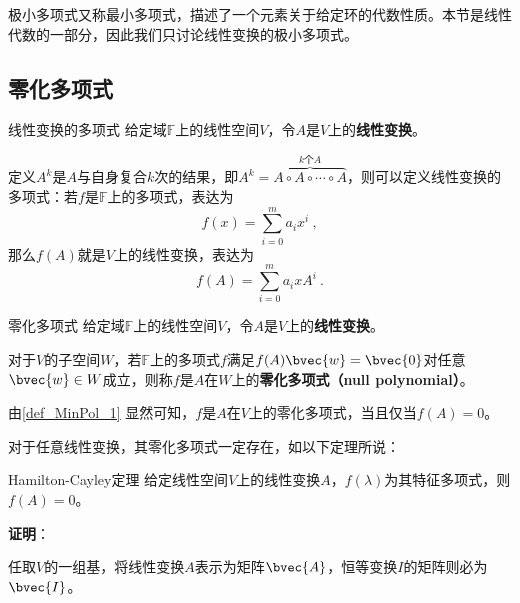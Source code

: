 



极小多项式又称最小多项式，描述了一个元素关于给定环的代数性质。本节是线性代数的一部分，因此我们只讨论线性变换的极小多项式。


\subsection{零化多项式}





\begin{definition}{线性变换的多项式}
给定域$\mathbb{F}$上的线性空间$V$，令$A$是$V$上的\textbf{线性变换}。

定义$A^k$是$A$与自身复合$k$次的结果，即$A^k=\overbrace{A\circ A\circ\cdots\circ A}^{k\text{个}A}$，则可以定义线性变换的多项式：若$f$是$\mathbb{F}$上的多项式，表达为
\begin{equation}
f(x) = \sum_{i=0}^m a_ix^i~, 
\end{equation}
那么$f(A)$就是$V$上的线性变换，表达为
\begin{equation}
f(A) = \sum_{i=0}^m a_ixA^i~. 
\end{equation}
\end{definition}



\begin{definition}{零化多项式}\label{def_MinPol_1}
给定域$\mathbb{F}$上的线性空间$V$，令$A$是$V$上的\textbf{线性变换}。

对于$V$的子空间$W$，若$\mathbb{F}$上的多项式$f$满足$f(A)\bvec{w}=\bvec{0}$对任意$\bvec{w}\in W$成立，则称$f$是$A$在$W$上的\textbf{零化多项式（null polynomial）}。
\end{definition}


由\autoref{def_MinPol_1} 显然可知，$f$是$A$在$V$上的零化多项式，当且仅当$f(A)=0$。


对于任意线性变换，其零化多项式一定存在，如以下定理所说：

\begin{theorem}{Hamilton-Cayley定理}
给定线性空间$V$上的线性变换$A$，$f(\lambda)$为其特征多项式，则$f(A)=0$。
\end{theorem}

\textbf{证明}：

任取$V$的一组基，将线性变换$A$表示为矩阵$\bvec{A}$，恒等变换$I$的矩阵则必为$\bvec{I}$。

